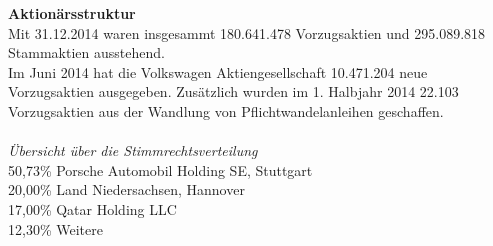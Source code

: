 \documentclass[12pt]{article}
\begin{document}
\textbf{Aktionärsstruktur}\\
Mit 31.12.2014 waren insgesammt 180.641.478 Vorzugsaktien und 295.089.818 Stammaktien ausstehend.\\
Im Juni 2014 hat die Volkswagen Aktiengesellschaft 10.471.204 neue Vorzugsaktien ausgegeben. Zusätzlich wurden im 1. Halbjahr 2014 22.103 Vorzugsaktien aus der Wandlung von Pflichtwandelanleihen geschaffen.
\cite{aktionaersstruktur} \\ \\
\textit{Übersicht über die Stimmrechtsverteilung} \\
50,73\% Porsche Automobil Holding SE, Stuttgart\\
20,00\% Land Niedersachsen, Hannover\\
17,00\% Qatar Holding LLC\\
12,30\% Weitere
\end{document}
